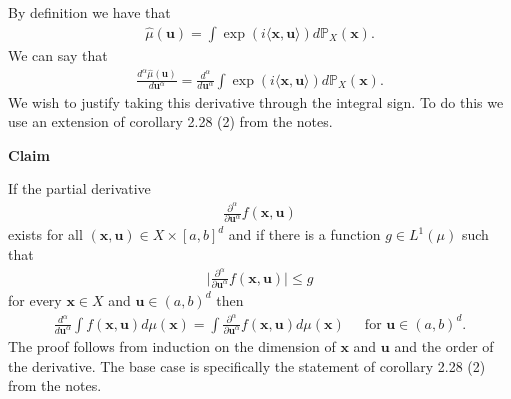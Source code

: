 \documentclass{unswmaths}
\begin{document}
\subsection{}
By definition we have that
\begin{align}
	\hat{\mu}(\mathbf{u}) = \int \exp(i \langle \mathbf{x}, \mathbf{u} \rangle ) d\mathbb{P}_{X}(\mathbf{x}).
\end{align}
We can say that
\begin{align}
	\frac{d^\alpha \hat{\mu}(\mathbf{u})}{d \mathbf{u}^\alpha} = \frac{d^\alpha}{d \mathbf{u}^\alpha} \int \exp(i \langle \mathbf{x}, \mathbf{u} \rangle ) d\mathbb{P}_{X}(\mathbf{x}).
\end{align}
We wish to justify taking this derivative through the integral sign. To do this we use an extension of corollary 2.28 (2) from the notes.
\clearpage
\begin{mdframed}
\textbf{Claim}

If the partial derivative 
\begin{align}
	\frac{\partial^\alpha}{\partial\mathbf{u}^\alpha} f(\mathbf{x}, \mathbf{u})
\end{align}
exists for all $ (\mathbf{x}, \mathbf{u}) \in X \times [a, b]^d $ and if there is a function $ g \in L^{1}(\mu) $ such that
\begin{align}
	\Big| \frac{\partial^\alpha}{\partial \mathbf{u}^\alpha} f(\mathbf{x}, \mathbf{u}) \Big| \leq g
\end{align}
for every $ \mathbf{x} \in X $ and $ \mathbf{u} \in (a,b)^d $ then
\begin{align}
	\frac{d^\alpha}{d\mathbf{u}^\alpha} \int f(\mathbf{x}, \mathbf{u}) d\mu(\mathbf{x}) = \int \frac{\partial^\alpha}{\partial \mathbf{u}^\alpha} f(\mathbf{x}, \mathbf{u}) d\mu(\mathbf{x}) \ \ \ \ \ \text{ for } \mathbf{u} \in (a,b)^d.
\end{align}
The proof follows from induction on the dimension of $ \mathbf{x} $ and $ \mathbf{u} $ and the order of the derivative. The base case is specifically the statement of  corollary 2.28 (2) from the notes.
\end{mdframed}
\end{document}
